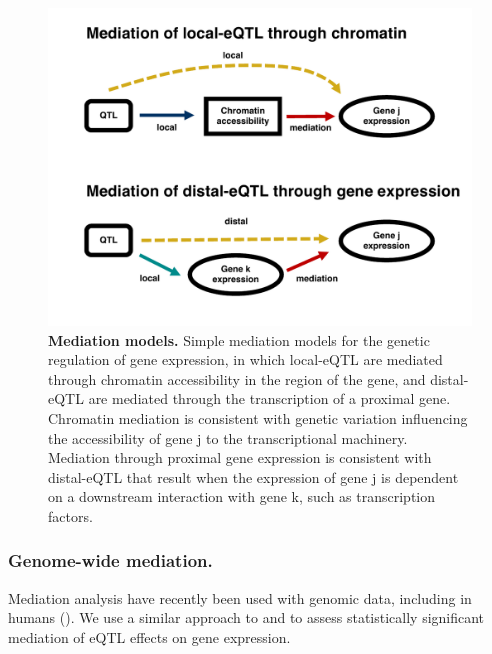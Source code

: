 \begin{figure}[htbp]
\renewcommand{\familydefault}{\sfdefault}\normalfont
\centering
\includegraphics[width=\linewidth, page=1, clip, trim={0in 0.5in 0in 0in}]{figs/mediation_graph.pdf}
\caption{\textbf{Mediation models.} Simple mediation models for the genetic regulation of gene expression, in which local-eQTL are mediated through chromatin accessibility in the region of the gene,  and  distal-eQTL are mediated through the transcription of a proximal gene. Chromatin mediation is consistent with genetic variation influencing the accessibility of gene j to the transcriptional machinery. Mediation through proximal gene expression is consistent with distal-eQTL that result when the expression of gene j is dependent on a downstream interaction with gene k, such as transcription factors. \label{fig:graph}}
\end{figure}

\subsubsection{Genome-wide mediation.}

Mediation analysis have recently been used with genomic data, including in humans (\eg \citealt{Battle2014}). We use a similar approach to \cite{Chick2016} and \cite{Keller2018} to assess statistically significant mediation of eQTL effects on gene expression.


